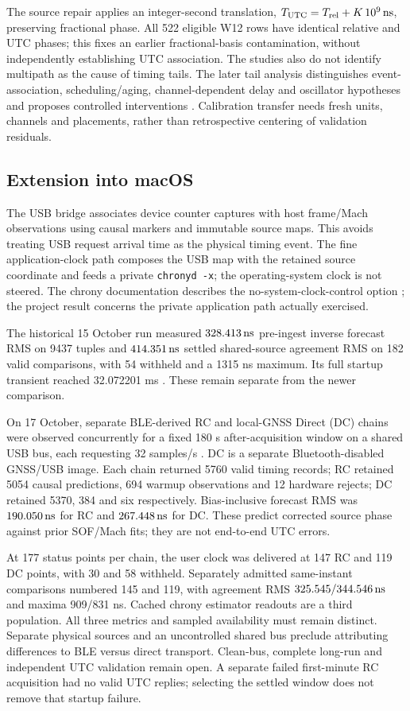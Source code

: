 \documentclass[11pt,letterpaper]{article}
\begin{document}
The source repair applies an integer-second translation, $T_{\mathrm{UTC}}=T_{\mathrm{rel}}+K\,10^9\,\mathrm{ns}$, preserving fractional phase. All 522 eligible W12 rows have identical relative and UTC phases; this fixes an earlier fractional-basis contamination, without independently establishing UTC association. The studies also do not identify multipath as the cause of timing tails. The later tail analysis distinguishes event-association, scheduling/aging, channel-dependent delay and oscillator hypotheses and proposes controlled interventions \cite{tails}. Calibration transfer needs fresh units, channels and placements, rather than retrospective centering of validation residuals.

\subsection{Extension into macOS}
The USB bridge associates device counter captures with host frame/Mach observations using causal markers and immutable source maps. This avoids treating USB request arrival time as the physical timing event. The fine application-clock path composes the USB map with the retained source coordinate and feeds a private \mbox{\texttt{chronyd -x}}; the operating-system clock is not steered. The chrony documentation describes the no-system-clock-control option \cite{chrony}; the project result concerns the private application path actually exercised.

The historical 15 October run measured $328.413\,\mathrm{ns}$ pre-ingest inverse forecast RMS on 9437 tuples and $414.351\,\mathrm{ns}$ settled shared-source agreement RMS on 182 valid comparisons, with 54 withheld and a 1315 ns maximum. Its full startup transient reached 32.072201 ms \cite{legacy,mac}. These remain separate from the newer comparison.

On 17 October, separate BLE-derived RC and local-GNSS Direct (DC) chains were observed concurrently for a fixed 180 s after-acquisition window on a shared USB bus, each requesting 32 samples/s \cite{mac}. DC is a separate Bluetooth-disabled GNSS/USB image. Each chain returned 5760 valid timing records; RC retained 5054 causal predictions, 694 warmup observations and 12 hardware rejects; DC retained 5370, 384 and six respectively. Bias-inclusive forecast RMS was $190.050\,\mathrm{ns}$ for RC and $267.448\,\mathrm{ns}$ for DC. These predict corrected source phase against prior SOF/Mach fits; they are not end-to-end UTC errors.

At 177 status points per chain, the user clock was delivered at 147 RC and 119 DC points, with 30 and 58 withheld. Separately admitted same-instant comparisons numbered 145 and 119, with agreement RMS $325.545/344.546\,\mathrm{ns}$ and maxima 909/831 ns. Cached chrony estimator readouts are a third population. All three metrics and sampled availability must remain distinct. Separate physical sources and an uncontrolled shared bus preclude attributing differences to BLE versus direct transport. Clean-bus, complete long-run and independent UTC validation remain open. A separate failed first-minute RC acquisition had no valid UTC replies; selecting the settled window does not remove that startup failure.
\end{document}
